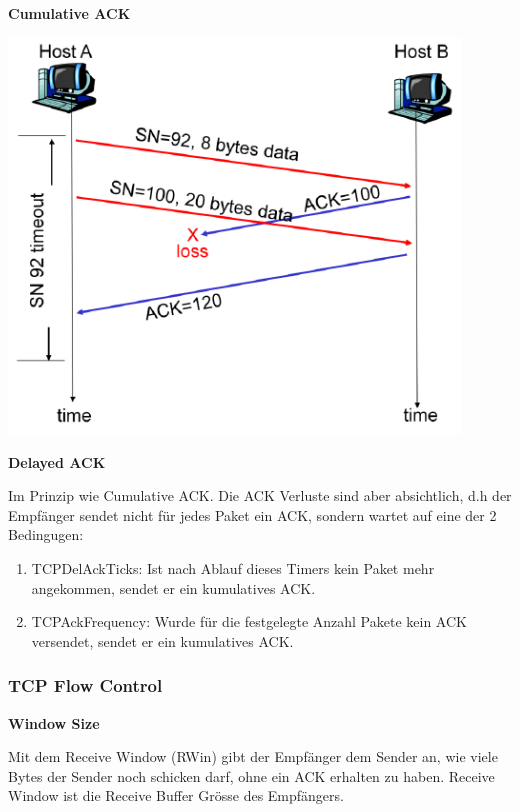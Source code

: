 \begin{minipage}[t]{0.5\linewidth}
	\textbf{Cumulative ACK}

	\vspace{5mm}

	\includegraphics[width=0.9\textwidth]{media/cumulativeACK.png}
\end{minipage}
\begin{minipage}[t]{0.5\linewidth}
	\textbf{Delayed ACK}

	\vspace{5mm}

	Im Prinzip wie Cumulative ACK. Die ACK Verluste sind aber absichtlich, d.h der
	Empfänger sendet nicht für jedes Paket ein ACK, sondern wartet auf eine der 2
	Bedingugen:

	\begin{enumerate}
		\item TCPDelAckTicks: Ist nach Ablauf dieses Timers kein Paket mehr
			angekommen, sendet er ein kumulatives ACK.
		\item TCPAckFrequency: Wurde für die festgelegte Anzahl Pakete kein ACK
			versendet, sendet er ein kumulatives ACK.
	\end{enumerate}
\end{minipage}

\subsubsection{TCP Flow Control}

\textbf{Window Size}

Mit dem Receive Window (RWin) gibt der Empfänger dem Sender an, wie viele Bytes
der Sender noch schicken darf, ohne ein ACK erhalten zu haben. Receive Window
ist die Receive Buffer Grösse des Empfängers.

